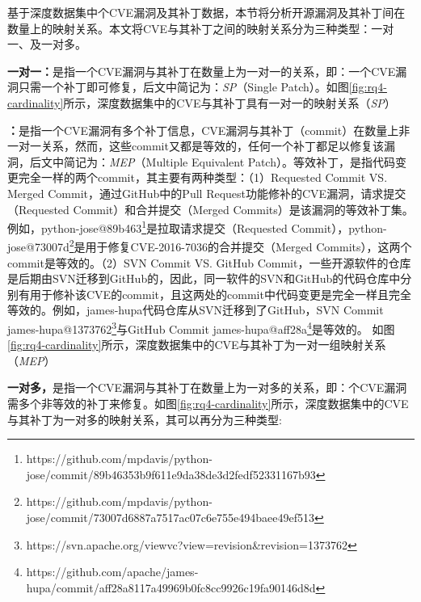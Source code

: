 基于深度数据集中个CVE漏洞及其补丁数据，本节将分析开源漏洞及其补丁间在数量上的映射关系。本文将CVE与其补丁之间的映射关系分为三种类型：一对一、及一对多。

\textbf{一对一：}是指一个CVE漏洞与其补丁在数量上为一对一的关系，即：一个CVE漏洞只需一个补丁即可修复，后文中简记为：\textit{SP}（Single Patch）。如图\ref{fig:rq4-cardinality}所示，深度数据集中的CVE与其补丁具有一对一的映射关系（\textit{SP}）

\textbf{：}是指一个CVE漏洞有多个补丁信息，CVE漏洞与其补丁（commit）在数量上非一对一关系，然而，这些commit又都是等效的，任何一个补丁都足以修复该漏洞，后文中简记为：\textit{MEP}（Multiple Equivalent Patch）。等效补丁，是指代码变更完全一样的两个commit，其主要有两种类型：（1）Requested Commit VS. Merged Commit，通过GitHub中的Pull Request功能修补的CVE漏洞，请求提交（Requested Commit）和合并提交（Merged Commits）是该漏洞的等效补丁集。例如，python-jose@89b463\footnote{https://github.com/mpdavis/python-jose/commit/89b46353b9f611e9da38de3d2fedf52331167b93}是拉取请求提交（Requested Commit），python-jose@73007d\footnote{https://github.com/mpdavis/python-jose/commit/73007d6887a7517ac07c6e755e494baee49ef513}是用于修复CVE-2016-7036的合并提交（Merged Commits），这两个commit是等效的。（2）SVN Commit VS. GitHub Commit，一些开源软件的仓库是后期由SVN迁移到GitHub的，因此，同一软件的SVN和GitHub的代码仓库中分别有用于修补该CVE的commit，且这两处的commit中代码变更是完全一样且完全等效的。例如，james-hupa代码仓库从SVN迁移到了GitHub，SVN Commit james-hupa@1373762\footnote{https://svn.apache.org/viewvc?view=revision\&revision=1373762}与GitHub Commit james-hupa@aff28a\footnote{https://github.com/apache/james-hupa/commit/aff28a8117a49969b0fc8cc9926c19fa90146d8d}是等效的。
如图\ref{fig:rq4-cardinality}所示，深度数据集中的CVE与其补丁为一对一组映射关系（\textit{MEP}）

\textbf{一对多，}是指一个CVE漏洞与其补丁在数量上为一对多的关系，即：个CVE漏洞需多个非等效的补丁来修复。如图\ref{fig:rq4-cardinality}所示，深度数据集中的CVE与其补丁为一对多的映射关系，其可以再分为三种类型: 

